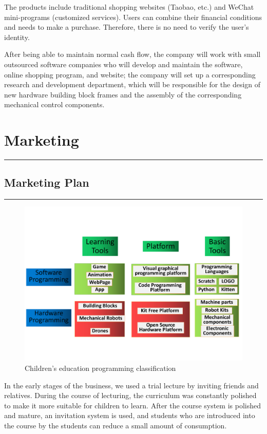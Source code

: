 \documentclass[12pt]{extarticle}
\numberwithin{figure}{section}
\begin{document}
The products include traditional shopping websites (Taobao, etc.) and WeChat mini-programs (customized services). Users can combine their financial conditions and needs to make a purchase. Therefore, there is no need to verify the user's identity.

After being able to maintain normal cash flow, the company will work with small outsourced software companies who will develop and maintain the software, online shopping program, and website; the company will set up a corresponding research and development department, which will be responsible for the design of new hardware building block frames and the assembly of the corresponding mechanical control components.

\section{Marketing}
\vspace{-0.1cm}
\hrule
\vspace{0.2cm}
\subsection{Marketing Plan}
\vspace{-0.1cm}
\hrule
\vspace{-0.2cm}

\begin{figure}[ht]
    \centering  %
    \includegraphics[scale = 0.5]{test.pdf}
    \caption{Children's education programming classification}
\end{figure}

In the early stages of the business, we used a trial lecture by inviting friends and relatives. During the course of lecturing, the curriculum was constantly polished to make it more suitable for children to learn. After the course system is polished and mature, an invitation system is used, and students who are introduced into the course by the students can reduce a small amount of consumption.
\end{document}
